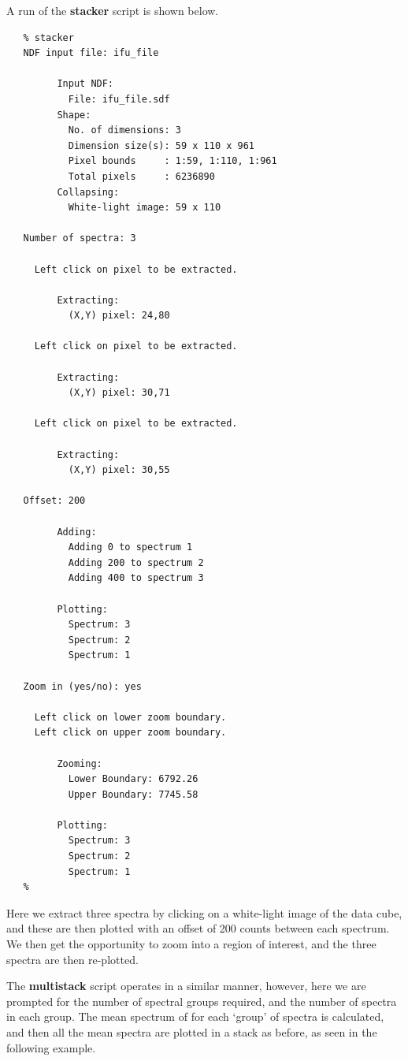 \documentclass[twoside,11pt]{article}
\begin{document}
{A run of the {\bf stacker} script is shown below.
 
\small\begin{verbatim}
   % stacker
   NDF input file: ifu_file
 
         Input NDF:
           File: ifu_file.sdf
         Shape:
           No. of dimensions: 3
           Dimension size(s): 59 x 110 x 961
           Pixel bounds     : 1:59, 1:110, 1:961
           Total pixels     : 6236890
         Collapsing:
           White-light image: 59 x 110
 
   Number of spectra: 3
 
     Left click on pixel to be extracted.
 
         Extracting:
           (X,Y) pixel: 24,80
 
     Left click on pixel to be extracted.
 
         Extracting:
           (X,Y) pixel: 30,71
 
     Left click on pixel to be extracted.
 
         Extracting:
           (X,Y) pixel: 30,55
 
   Offset: 200
 
         Adding:
           Adding 0 to spectrum 1
           Adding 200 to spectrum 2
           Adding 400 to spectrum 3
 
         Plotting:
           Spectrum: 3 
           Spectrum: 2 
           Spectrum: 1 
 
   Zoom in (yes/no): yes
 
     Left click on lower zoom boundary.
     Left click on upper zoom boundary.
 
         Zooming:
           Lower Boundary: 6792.26
           Upper Boundary: 7745.58
 
         Plotting:
           Spectrum: 3
           Spectrum: 2
           Spectrum: 1
   %
\end{verbatim}\normalsize

Here we extract three spectra by clicking on a white-light image of
the data cube, and these are then plotted with an offset of 200 counts
between each spectrum.  We then get the opportunity to zoom into a
region of interest, and the three spectra are then re-plotted.

The {\bf multistack} script operates in a similar manner, however, here
we are prompted for the number of spectral groups required, and the
number of spectra in each group.  The mean spectrum of for each
`group' of spectra is calculated, and then all the mean spectra are
plotted in a stack as before, as seen in the following example. 

}
\end{document}
